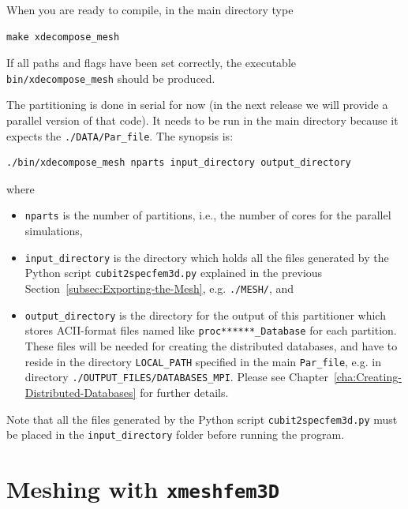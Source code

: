 When you are ready to compile, in the main directory type
{\small
\begin{verbatim}
make xdecompose_mesh
\end{verbatim}
}
\noindent
If all paths and flags have been set correctly, the executable \texttt{bin/xdecompose\_mesh}
should be produced.

The partitioning is done in serial for now (in the next release we
will provide a parallel version of that code). It needs to be run in the main directory because it expects the \texttt{./DATA/Par\_file}.
The synopsis is:
%
\begin{verbatim}
./bin/xdecompose_mesh nparts input_directory output_directory
\end{verbatim}
%
\noindent
where
\begin{itemize}
\item \texttt{nparts} is the number of partitions, i.e., the number of cores
for the parallel simulations,
\item \texttt{input\_directory} is the directory which holds all the files
generated by the Python script \texttt{cubit2specfem3d.py} explained
in the previous Section~\ref{subsec:Exporting-the-Mesh}, e.g. \texttt{./MESH/},
and
\item \texttt{output\_directory} is the directory for the output of this
partitioner which stores ACII-format files named like \texttt{proc{*}{*}{*}{*}{*}{*}\_Database}
for each partition. These files will be needed for creating the distributed
databases, and have to reside in the directory \texttt{LOCAL\_PATH}
specified in the main \texttt{Par\_file}, e.g. in directory \texttt{./OUTPUT\_FILES/DATABASES\_MPI}.
Please see Chapter~\ref{cha:Creating-Distributed-Databases} for
further details.
\end{itemize}
Note that all the files generated by the Python script \texttt{cubit2specfem3d.py}
must be placed in the \texttt{input\_directory} folder before running
the program.


\section{Meshing with \texttt{xmeshfem3D}}\label{cha:Running-the-Mesher-Meshfem3D}

